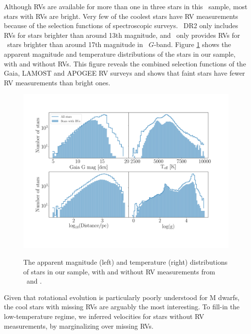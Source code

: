 Although RVs are available for more than one in three stars in this \kepler\
sample, most stars with RVs are bright.
Very few of the coolest stars have RV measurements because of the selection
functions of spectroscopic surveys.
\gaia\ DR2 only includes RVs for stars brighter than around 13th magnitude,
and \lamost\ only provides RVs for \kepler\ stars brighter than around 17th
magnitude in \gaia\ $G$-band.
Figure \ref{fig:rv_histogram} shows the apparent magnitude and temperature
distributions of the stars in our sample, with and without RVs.
This figure reveals the combined selection functions of the Gaia, LAMOST and
APOGEE RV surveys and shows that faint stars have fewer RV measurements than
bright ones.
\begin{figure}[ht!]
\caption{
    The apparent magnitude (left) and temperature (right) distributions of
    stars in our sample, with and without RV measurements from \gaia\ and
    \lamost.
}
  \centering \includegraphics[width=1\textwidth]{rv_histogram}
\label{fig:rv_histogram}
\end{figure}
Given that rotational evolution is particularly poorly understood for M
dwarfs, the cool stars with missing RVs are arguably the most interesting.
To fill-in the low-temperature regime, we inferred velocities for stars
without RV measurements, by marginalizing over missing RVs.
